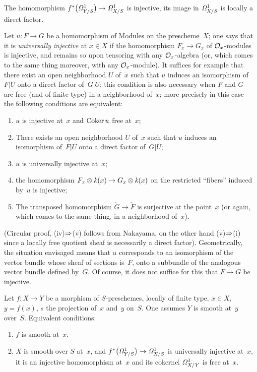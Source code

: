 \begin{corollary}
\label{II.4.4}
The homomorphism
$f^*\big(\it{\Omega}^1_{Y/S}\big)\to\it{\Omega}^1_{X/S}$ is
injective, its image in $\it{\Omega}^1_{X/S}$ is locally a
direct factor.
\end{corollary}

Let $u\colon F\to G$ be a homomorphism of Modules on the
prescheme~$X$; one says that it is \emph{universally
injective}
at $x\in X$ if the homomorphism $F_{x}\to G_{x}$ of
$\cal{O}_{x}$-modules is injective, and remains so upon tensoring
with any $\cal{O}_{x}$-algebra (or, which comes to the same thing
moreover, with any $\cal{O}_{x}$-module). It suffices for example
that there exist an open neighborhood $U$ of~$x$ such that $u$ induces an
isomorphism of~$F|U$ onto a direct factor of~$G|U$; this condition
is also necessary when $F$ and $G$ are free (and of finite
type) in a neighborhood of~$x$; more precisely in this case
the following conditions are equivalent:
\begin{enumerate}
\item[(i)] $u$ is injective at~$x$ and $\Coker u$ free at~$x$;
\item[(ii)] There exists an open neighborhood $U$ of~$x$ such that $u$
induces an isomorphism of~$F|U$ onto a direct factor of~$G|U$;
\item[(iii)] $u$ is universally injective at~$x$;
\item[(iv)] the homomorphism
$F_{x}\otimes \kres(x)\to G_{x}\otimes \kres(x)$
on the restricted ``fibers'' induced by~$u$ is injective;
\item[(v)] The transposed homomorphism $\check{G}\to\check{F}$ is
surjective at the point~$x$ (or again, which comes to the
same thing, in a neighborhood of~$x$).
\end{enumerate}
(Circular proof, (iv)$\To$(v) follows from
Nakayama, on the other hand (v)$\To$(i)
since a locally free quotient sheaf is necessarily a
direct factor). Geometrically, the situation envisaged
means that $u$ corresponds to an isomorphism of the vector bundle whose
sheaf of sections is~$F$, onto a subbundle of the
analogous vector bundle defined by~$G$. Of course, it does
not suffice for this that $F\to G$ be injective.

\begin{corollary}
\label{II.4.5}
Let $f\colon X\to Y$ be a morphism of $S$-preschemes,
locally of finite type, $x\in X$, $y=f(x)$, $s$ the projection of~$x$
and~$y$ on~$S$. One assumes $Y$ is smooth at~$y$ over~$S$. Equivalent
conditions:
\begin{enumerate}
\item[(i)] $f$ is smooth at~$x$.
\item[(ii)] $X$ is smooth over $S$
at~$x$, and
$f^*\big(\it{\Omega}^1_{Y/S}\big)\to\it{\Omega}^1_{X/S}$ is
universally injective at~$x$, \ie it is an injective homomorphism at~$x$ and its cokernel $\it{\Omega}^1_{X/Y}$ is free
at~$x$.
\end{enumerate}
\end{corollary}

